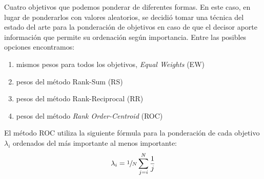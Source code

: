 %
	Cuatro objetivos que podemos ponderar de diferentes formas. En este caso, en lugar de ponderarlos con valores aleatorios, se decidió tomar una técnica del estado del arte para la ponderación de objetivos en caso de que el decisor aporte información que permite su ordenación según importancia. Entre las posibles opciones encontramos:
    
    \begin{enumerate}[label=\alph*)]
        \item mismos pesos para todos los objetivos, \textit{Equal Weights} (EW)~\cite{ew-paper}
        \item pesos del método Rank-Sum (RS)~\cite{rs-rr-paper}
        \item pesos del método Rank-Reciprocal (RR)~\cite{rs-rr-paper}
        \item pesos del método \textit{Rank Order-Centroid} (ROC)~\cite{roc-paper}
    \end{enumerate}
%



El método ROC utiliza la siguiente fórmula para la ponderación de cada objetivo $\lambda_i$ ordenados del más importante al menos importante:
\[
    \lambda_i = \sfrac{1}{N} \sum_{j=i}^N \frac{1}{j}
\]

